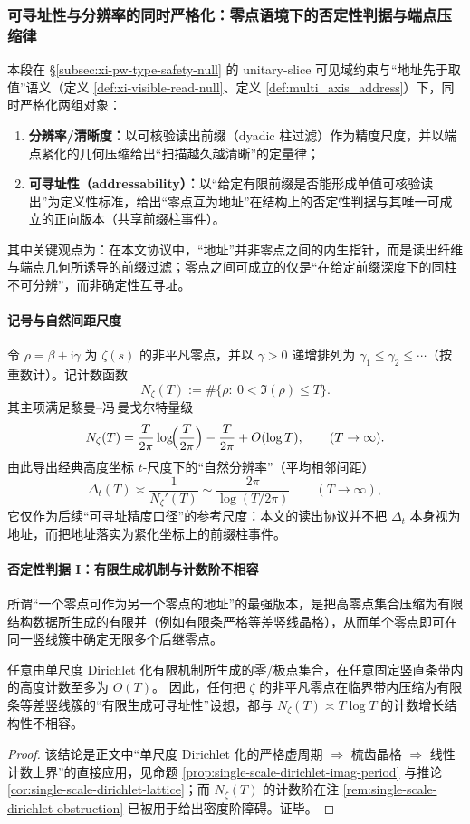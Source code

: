 \subsubsection{可寻址性与分辨率的同时严格化：零点语境下的否定性判据与端点压缩律}\label{subsubsec:xi-addressability-resolution-law}
本段在 \S\ref{subsec:xi-pw-type-safety-null} 的 unitary-slice 可见域约束与“地址先于取值”语义（定义 \ref{def:xi-visible-read-null}、定义 \ref{def:multi_axis_address}）下，同时严格化两组对象：
\begin{enumerate}
  \item \textbf{分辨率/清晰度：}以可核验读出前缀（dyadic 柱过滤）作为精度尺度，并以端点紧化的几何压缩给出“扫描越久越清晰”的定量律；
  \item \textbf{可寻址性（addressability）：}以“给定有限前缀是否能形成单值可核验读出”为定义性标准，给出“零点互为地址”在结构上的否定性判据与其唯一可成立的正向版本（共享前缀柱事件）。
\end{enumerate}
其中关键观点为：在本文协议中，“地址”并非零点之间的内生指针，而是读出纤维与端点几何所诱导的前缀过滤；零点之间可成立的仅是“在给定前缀深度下的同柱不可分辨”，而非确定性互寻址。

\paragraph{记号与自然间距尺度}
令 \(\rho=\beta+\mathrm{i}\gamma\) 为 \(\zeta(s)\) 的非平凡零点，并以 \(\gamma>0\) 递增排列为 \(\gamma_1\le\gamma_2\le\cdots\)（按重数计）。记计数函数
\[
N_\zeta(T):=\#\{\rho:\ 0<\Im(\rho)\le T\}.
\]
其主项满足黎曼--冯\,曼戈尔特量级
\[
N_\zeta(T)=\frac{T}{2\pi}\log\!\Bigl(\frac{T}{2\pi}\Bigr)-\frac{T}{2\pi}+O(\log T),
\qquad(T\to\infty).
\]
由此导出经典高度坐标 \(t\)-尺度下的“自然分辨率”（平均相邻间距）
\[
\Delta_t(T)\asymp \frac{1}{N_\zeta'(T)}\sim \frac{2\pi}{\log(T/2\pi)}\qquad(T\to\infty),
\]
它仅作为后续“可寻址精度口径”的参考尺度：本文的读出协议并不把 \(\Delta_t\) 本身视为地址，而把地址落实为紧化坐标上的前缀柱事件。

\paragraph{否定性判据 I：有限生成机制与计数阶不相容}
所谓“一个零点可作为另一个零点的地址”的最强版本，是把高零点集合压缩为有限结构数据所生成的有限并（例如有限条严格等差竖线晶格），从而单个零点即可在同一竖线簇中确定无限多个后继零点。
\begin{proposition}[有限生成可寻址性的计数障碍]\label{prop:xi-addressability-counting-obstruction}
任意由单尺度 Dirichlet 化有限机制所生成的零/极点集合，在任意固定竖直条带内的高度计数至多为 \(O(T)\)。
因此，任何把 \(\zeta\) 的非平凡零点在临界带内压缩为有限条等差竖线簇的“有限生成可寻址性”设想，都与 \(N_\zeta(T)\asymp T\log T\) 的计数增长结构性不相容。
\end{proposition}
\begin{proof}
该结论是正文中“单尺度 Dirichlet 化的严格虚周期 \(\Rightarrow\) 梳齿晶格 \(\Rightarrow\) 线性计数上界”的直接应用，见命题 \ref{prop:single-scale-dirichlet-imag-period} 与推论 \ref{cor:single-scale-dirichlet-lattice}；而 \(N_\zeta(T)\) 的计数阶在注 \ref{rem:single-scale-dirichlet-obstruction} 已被用于给出密度阶障碍。证毕。
\end{proof}

